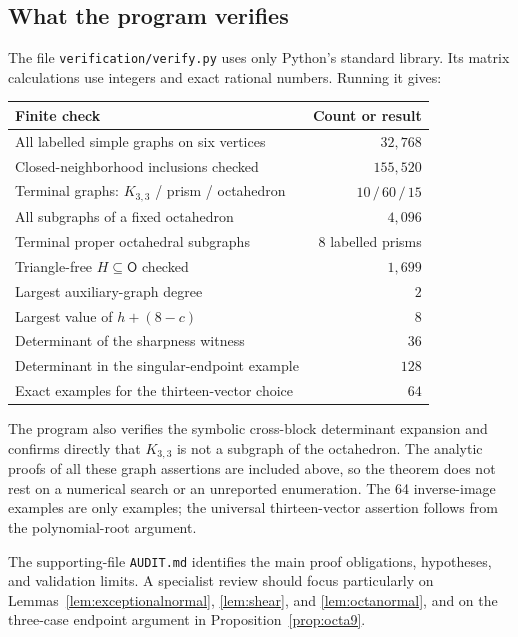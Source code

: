 \documentclass[11pt,a4paper]{article}
\theoremstyle{definition}
\newcommand{\OO}{\mathsf{O}}
\begin{document}
\subsection{What the program verifies}
The file \texttt{verification/verify.py} uses only Python's standard library. Its matrix calculations use integers and exact rational numbers. Running it gives:
\begin{center}
\begin{tabular}{@{}lr@{}}
\toprule
Finite check & Count or result\\
\midrule
All labelled simple graphs on six vertices & $32{,}768$\\
Closed-neighborhood inclusions checked & $155{,}520$\\
Terminal graphs: $K_{3,3}$ / prism / octahedron & $10\,/\,60\,/\,15$\\
All subgraphs of a fixed octahedron & $4{,}096$\\
Terminal proper octahedral subgraphs & $8$ labelled prisms\\
Triangle-free $H\subseteq\OO$ checked & $1{,}699$\\
Largest auxiliary-graph degree & $2$\\
Largest value of $h+(8-c)$ & $8$\\
Determinant of the sharpness witness & $36$\\
Determinant in the singular-endpoint example & $128$\\
Exact examples for the thirteen-vector choice & $64$\\
\bottomrule
\end{tabular}
\end{center}
The program also verifies the symbolic cross-block determinant expansion and confirms directly that $K_{3,3}$ is not a subgraph of the octahedron. The analytic proofs of all these graph assertions are included above, so the theorem does not rest on a numerical search or an unreported enumeration. The 64 inverse-image examples are only examples; the universal thirteen-vector assertion follows from the polynomial-root argument.

The supporting-file \texttt{AUDIT.md} identifies the main proof obligations, hypotheses, and validation limits. A specialist review should focus particularly on Lemmas~\ref{lem:exceptionalnormal}, \ref{lem:shear}, and \ref{lem:octanormal}, and on the three-case endpoint argument in Proposition~\ref{prop:octa9}.
\end{document}
